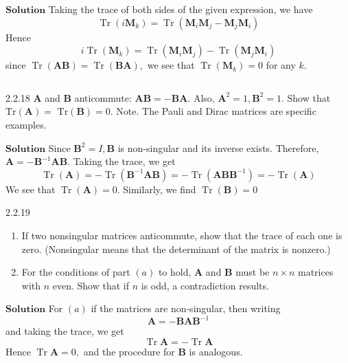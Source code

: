 $\boxed{\textbf{Solution}}$  Taking the trace of both sides of the given expression, we have
$$
\operatorname{Tr}\left(i \mathbf{M}_{k}\right)=\operatorname{Tr}\left(\mathbf{M}_{i} \mathbf{M}_{j}-\mathbf{M}_{j} \mathbf{M}_{i}\right)
$$
Hence
$$
i \operatorname{Tr}\left(\mathbf{M}_{k}\right)=\operatorname{Tr}\left(\mathbf{M}_{i} \mathbf{M}_{j}\right)-\operatorname{Tr}\left(\mathbf{M}_{j} \mathbf{M}_{i}\right)
$$
since $\operatorname{Tr}(\mathbf{A}\mathbf{B})=\operatorname{Tr}(\mathbf{B}\mathbf{A}),$ we see that $\operatorname{Tr}\left(\mathbf{M}_{k}\right)=0$ for any $k .$

$$$$

\begin{mybox}{2.2.18}
$\mathbf{A}$ and $\mathbf{B}$ anticommute: $\mathbf{A}\mathbf{B}=-\mathbf{B}\mathbf{A}$. Also, $\mathbf{A}^{2}=1, \mathbf{B}^{2}=1 .$ Show that $\text{Tr}(\mathbf{A})=$
$\text{Tr}(\mathbf{B})=0 .$
Note. The Pauli and Dirac matrices are specific examples.
\end{mybox}



$\boxed{\textbf{Solution}}$ Since $\mathbf{B}^{2}=I, \mathbf{B}$ is non-singular and its inverse exists. Therefore, $\mathbf{A}=-\mathbf{B}^{-1} \mathbf{AB}$. Taking the trace, we get
$$
\operatorname{Tr}(\mathbf{A})=-\operatorname{Tr}\left(\mathbf{B}^{-1} \mathbf{AB}\right)=-\operatorname{Tr}\left(\mathbf{ABB}^{-1}\right)=-\operatorname{Tr}(\mathbf{A})
$$
We see that $\operatorname{Tr}(\mathbf{A})=0 .$ Similarly, we find $\operatorname{Tr}(\mathbf{B})=0$


\newpage




\begin{mybox}{2.2.19}
\begin{enumerate}[$(a)$]
\item If two nonsingular matrices anticommute, show that the trace of each one is zero.
(Nonsingular means that the determinant of the matrix is nonzero.)
\item For the conditions of part $(a)$ to hold, $\mathbf{A}$ and $\mathbf{B}$ must be $n \times n$ matrices with $n$ even.
Show that if $n$ is odd, a contradiction results.
\end{enumerate}
\end{mybox}

$\boxed{\textbf{Solution}}$ For $(a)$ if the matrices are non-singular, then writing 
$$\mathbf{A}=-\mathbf{B} \mathbf{A} \mathbf{B}^{-1}$$ 
and taking the trace, we get 
$$\operatorname{Tr} \mathbf{A}=-\operatorname{Tr} \mathbf{A}$$ 
Hence $\operatorname{Tr} \mathbf{A}=0,$ and the procedure for $\mathbf{B}$ is analogous.



